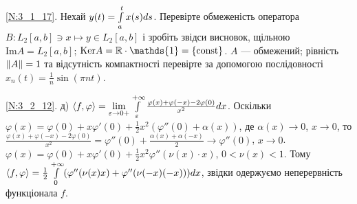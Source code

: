 \noindent\ref{N:3_1_17}. Нехай $y(t) = \int\limits_{a}^{t} x(s) ds$. Перевірте обмеженість
оператора $B: L_2[a,b] \ni x \mapsto y \in L_2[a,b]$ і зробіть звідси висновок, щільною
$\mathrm{Im}A = L_2[a,b]$; $\mathrm{Ker}A = \real \cdot \mathds{1} = \{\mathrm{const}\}$.
$A$ --- обмежений; рівність $\left\lVert A\right\rVert = 1$ та відсутність компактності перевірте за допомогою
послідовності $x_n(t) = \frac{1}{n}\sin(\pi n t)$.

\noindent\ref{N:3_2_12}. д) $\left\langle f, \varphi\right\rangle = \underset{\varepsilon \to 0+}{\lim}
\int\limits_{\varepsilon}^{+\infty} \frac{\varphi(x) + \varphi(-x) - 2\varphi(0)}{x^2} dx$.
Оскільки $\varphi(x) = \varphi(0) + x\varphi'(0) + \frac{1}{2}x^2 (\varphi''(0) + \alpha(x))$,
де $\alpha(x) \to 0$, $x\to 0$,
то $\frac{\varphi(x) + \varphi(-x) - 2\varphi(0)}{x^2} = 
\varphi''(0) + \frac{\alpha(x) + \alpha(-x)}{2} \to \varphi''(0)$, $x \to 0$.\\
$\varphi(x) = \varphi(0) + x\varphi'(0) + \frac{1}{2}x^2\varphi''(\nu(x)\cdot x)$, $0 < \nu(x) < 1$.
Тому  $\left\langle f, \varphi\right\rangle = \frac{1}{2}\int\limits_{0}^{+\infty} (\varphi''(\nu(x)x) + \varphi''(\nu(-x)(-x)))dx$,
звідки одержуємо неперервність функціонала $f$.